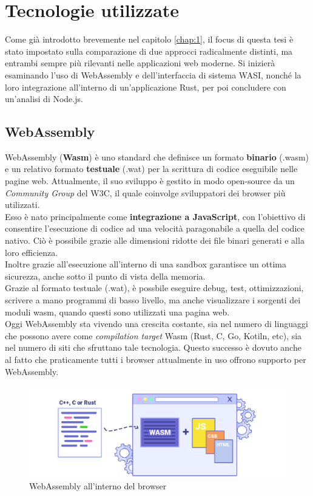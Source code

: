 \chapter{Tecnologie utilizzate}
\label{chap:2}
Come già introdotto brevemente nel capitolo \ref{chap:1}, il focus di questa tesi è stato impostato sulla comparazione di due approcci radicalmente distinti, ma entrambi sempre più rilevanti nelle applicazioni web moderne. Si inizierà esaminando l'uso di WebAssembly e dell'interfaccia di sistema WASI, nonché la loro integrazione all'interno di un'applicazione Rust, per poi concludere con un'analisi di Node.js.

\section{WebAssembly}
\label{sec:Wasm}
WebAssembly (\textbf{Wasm}) è uno standard che definisce un formato \textbf{binario} (.wasm) e un relativo formato \textbf{testuale} (.wat) per la scrittura di codice eseguibile nelle pagine web. 
Attualmente, il suo sviluppo è gestito in modo open-source da un \emph{Community Group} del W3C, il quale coinvolge sviluppatori dei browser più utilizzati.
\\Esso è nato principalmente come \textbf{integrazione a JavaScript}, con l'obiettivo di consentire l'esecuzione di codice ad una velocità paragonabile a quella del codice nativo.
Ciò è possibile grazie alle dimensioni ridotte dei file binari generati e alla loro efficienza.
\\Inoltre grazie all'esecuzione all'interno di una sandbox garantisce un ottima sicurezza, anche sotto il punto di vista della memoria.
\\Grazie al formato testuale (.wat), è possbile eseguire debug, test, ottimizzazioni, scrivere a mano programmi di basso livello, ma anche visualizzare i sorgenti dei moduli wasm, quando questi sono utilizzati una pagina web.
\cite*{wasmDesign}
\\Oggi WebAssembly sta vivendo una crescita costante, sia nel numero di linguaggi che possono avere come \emph{compilation target} Wasm (Rust, C, Go, Kotiln, etc), sia nel numero di siti che sfruttano tale tecnologia. Questo successo è dovuto anche al fatto che praticamente tutti i browser attualmente in uso offrono supporto per WebAssembly. 
\begin{figure}
        \begin{center}
                \includegraphics[width=0.8\columnwidth]{images/wasm.png}
        \end{center}
        \caption{WebAssembly all'interno del browser}
        \label{fig:wasm}
\end{figure}
